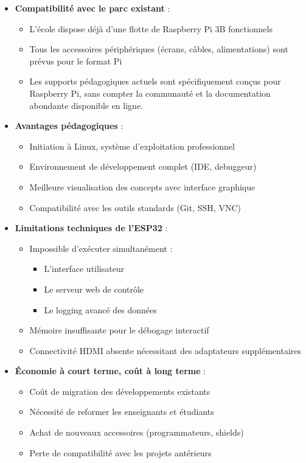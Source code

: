 \documentclass[a4paper, 12pt]{article}
\begin{document}
	\begin{itemize}
		\item \textbf{Compatibilité avec le parc existant} :
		\begin{itemize}
			\item L'école dispose déjà d'une flotte de Raspberry Pi 3B fonctionnels
			\item Tous les accessoires périphériques (écrans, câbles, alimentations) sont prévus pour le format Pi
			\item Les supports pédagogiques actuels sont spécifiquement conçus pour Raspberry Pi, sans compter la communauté et la documentation abondante disponible en ligne.
		\end{itemize}
		
		\item \textbf{Avantages pédagogiques} :
		\begin{itemize}
			\item Initiation à Linux, système d'exploitation professionnel
			\item Environnement de développement complet (IDE, debuggeur)
			\item Meilleure visualisation des concepts avec interface graphique
			\item Compatibilité avec les outils standards (Git, SSH, VNC)
		\end{itemize}
		
		\item \textbf{Limitations techniques de l'ESP32} :
		\begin{itemize}
			\item Impossible d'exécuter simultanément :
			\begin{itemize}
				\item L'interface utilisateur
				\item Le serveur web de contrôle
				\item Le logging avancé des données
			\end{itemize}
			\item Mémoire insuffisante pour le débogage interactif
			\item Connectivité HDMI absente nécessitant des adaptateurs supplémentaires
		\end{itemize}
		
		\item \textbf{Économie à court terme, coût à long terme} :
		\begin{itemize}
			\item Coût de migration des développements existants
			\item Nécessité de reformer les enseignants et étudiants
			\item Achat de nouveaux accessoires (programmateurs, shields)
			\item Perte de compatibilité avec les projets antérieurs
		\end{itemize}
		

\end{itemize}
\end{document}
